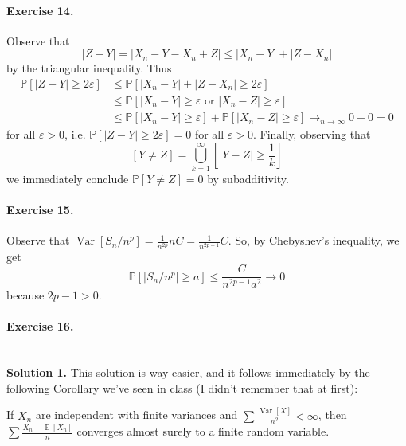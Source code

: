 \documentclass[12pt,a4paper]{report}
\theoremstyle{definition}
\theoremstyle{num.custom-title}
\DeclareMathOperator{\E}{\mathbb{E}}
\DeclareMathOperator{\Var}{Var}
\renewcommand{\epsilon}{\varepsilon}
\renewcommand{\1}{\mathbbm{1}}
\renewcommand{\P}{\mathbb{P}}
\begin{document}
\paragraph{Exercise 14.} Observe that
\[
|Z-Y| = |X_n - Y - X_n + Z| \leq |X_n - Y| + |Z - X_n|
\]
by the triangular inequality. Thus
\begin{align*}
	\P[|Z-Y| \geq 2\epsilon]
	&\leq \P[|X_n - Y| + |Z - X_n| \geq 2\epsilon] \\
	&\leq \P[|X_n-Y| \geq \epsilon \text{ or } |X_n-Z| \geq \epsilon] \\
	&\leq \P[|X_n-Y| \geq \epsilon] + \P[|X_n-Z| \geq \epsilon] \to_{n \to \infty} 0+0=0
\end{align*}
for all $\epsilon>0$, i.e. $\P[|Z-Y| \geq 2\epsilon]=0$ for all $\epsilon>0$. Finally, observing that
\[
[Y \neq Z] = \bigcup_{k=1}^\infty \left[ |Y-Z| \geq \frac{1}{k} \right]
\]
we immediately conclude $\P[Y \neq Z]=0$ by subadditivity.

\paragraph{Exercise 15.} Observe that $\Var[S_n/n^p] = \frac{1}{n^{2p}} nC = \frac{1}{n^{2p-1}} C$. So, by Chebyshev's inequality, we get
\[
\P[|S_n/n^p| \geq a] \leq \frac{C}{n^{2p-1} a^2} \to 0
\]
because $2p-1>0$.

\paragraph{Exercise 16.} \ \\
\textbf{Solution 1.} This solution is way easier, and it follows immediately by the following Corollary we've seen in class (I didn't remember that at first):
\begin{center}
If $X_n$ are independent with finite variances and $\sum \frac{\Var[X]}{n^2} < \infty$, then $\sum \frac{X_n - \E[X_n]}{n}$ converges almost surely to a finite random variable.
\end{center}
\end{document}
